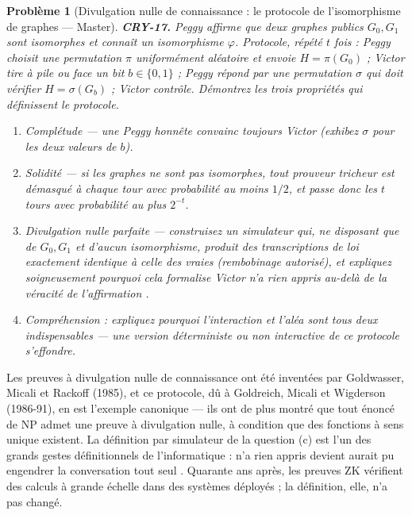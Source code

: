 \documentclass[11pt]{article}
\newtheorem{problem}{Problème}
\begin{document}
\bigskip

\begin{problem}[{Divulgation nulle de connaissance : le protocole de l'isomorphisme de graphes --- Master}]
\textbf{CRY-17.} Peggy affirme que deux graphes publics $G_0, G_1$
sont isomorphes et connaît un isomorphisme $\varphi$. Protocole, répété $t$
fois : Peggy choisit une permutation $\pi$ uniformément aléatoire et envoie
$H = \pi(G_0)$ ; Victor tire à pile ou face un bit $b \in \{0,1\}$ ; Peggy répond par une
permutation $\sigma$ qui doit vérifier $H = \sigma(G_b)$ ; Victor contrôle. Démontrez
les trois propriétés qui définissent le protocole.
\begin{enumerate}
\item[(a)] \textit{Complétude} --- une Peggy honnête convainc toujours
Victor (exhibez $\sigma$ pour les deux valeurs de $b$).
\item[(b)] \textit{Solidité}
--- si les graphes ne sont \textit{pas} isomorphes, tout prouveur tricheur est démasqué à chaque
tour avec probabilité au moins $1/2$, et passe donc les $t$ tours avec probabilité au plus
$2^{-t}$.
\item[(c)] \textit{Divulgation nulle parfaite} --- construisez un
simulateur qui, ne disposant que de $G_0, G_1$ et d'aucun isomorphisme, produit des
transcriptions de loi exactement identique à celle des vraies (rembobinage autorisé), et
expliquez soigneusement pourquoi cela formalise \og{} Victor n'a rien appris au-delà de la
véracité de l'affirmation \fg{}.
\item[(d)] Compréhension : expliquez pourquoi l'interaction et l'aléa sont tous deux
indispensables --- une version déterministe ou non interactive de ce protocole
s'effondre.
\end{enumerate}

\end{problem}

\noindent Les preuves à divulgation nulle de connaissance ont été inventées par
Goldwasser, Micali et Rackoff (1985), et ce protocole, dû à Goldreich, Micali et Wigderson
(1986-91), en est l'exemple canonique --- ils ont de plus montré que tout énoncé de NP admet
une preuve à divulgation nulle, à condition que des fonctions à sens unique existent. La
définition par simulateur de la question (c) est l'un des grands gestes définitionnels de
l'informatique : \og{} n'a rien appris \fg{} devient \og{} aurait pu engendrer la conversation tout seul \fg{}.
Quarante ans après, les preuves ZK vérifient des calculs à grande échelle dans des systèmes
déployés ; la définition, elle, n'a pas changé.
\end{document}
